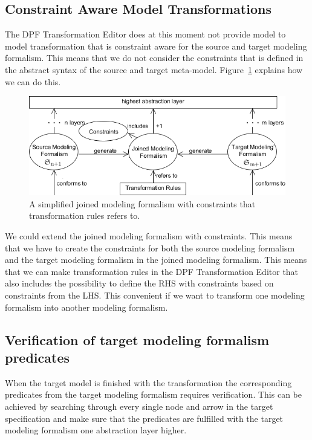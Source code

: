 \subsection{Constraint Aware Model Transformations}

The DPF Transformation Editor does at this moment not provide model to model
transformation that is constraint aware for the source and target modeling
formalism. This means that we do not consider the constraints that is
defined in the abstract syntax of the source and target meta-model.
Figure~\ref{fig:simple_modeling_formalism_constraints} explains how we can do
this.

\begin{figure}[H]
	\centering
	\includegraphics[scale=0.7]{./Figures/simple_modeling_formalism_constraints.png}
	\caption[Simplified joined specification]
	{A simplified joined modeling formalism with constraints that transformation
	rules refers to.}
	\label{fig:simple_modeling_formalism_constraints}
\end{figure}

We could extend the joined modeling formalism with constraints. This means that
we have to create the constraints for both the source modeling formalism and the
target modeling formalism in the joined modeling formalism. This means that we
can make transformation rules in the DPF Transformation Editor that also
includes the possibility to define the RHS with constraints based on constraints
from the LHS. This convenient if we want to transform one modeling formalism
into another modeling formalism.

\subsection{Verification of target modeling formalism predicates}

When the target model is finished with the transformation the corresponding
predicates from the target modeling formalism requires verification. This can be
achieved by searching through every single node and arrow in the target
specification and make sure that the predicates are fulfilled with the target
modeling formalism one abstraction layer higher. 






